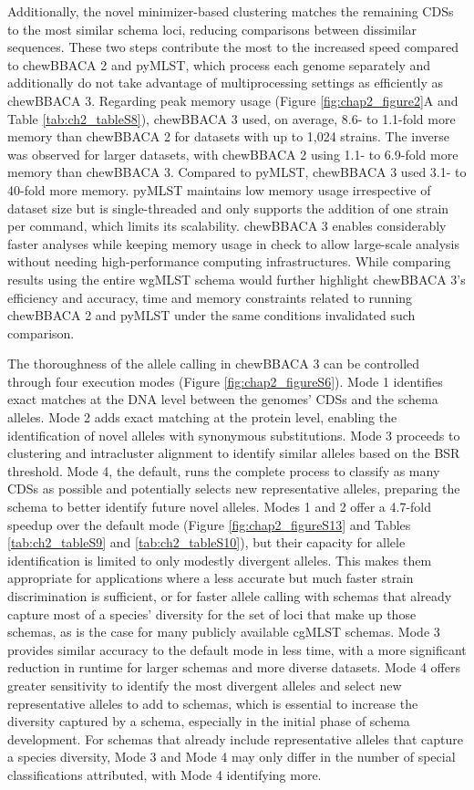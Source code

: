 Additionally, the novel minimizer-based clustering matches the remaining \acp{CDS} to the most similar schema loci, reducing comparisons between dissimilar sequences. These two steps contribute the most to the increased speed compared to chewBBACA 2 and pyMLST, which process each genome separately and additionally do not take advantage of multiprocessing settings as efficiently as chewBBACA 3. Regarding peak memory usage (Figure \ref{fig:chap2_figure2}A and Table \ref{tab:ch2_tableS8}), chewBBACA 3 used, on average, 8.6- to 1.1-fold more memory than chewBBACA 2 for datasets with up to 1,024 strains. The inverse was observed for larger datasets, with chewBBACA 2 using 1.1- to 6.9-fold more memory than chewBBACA 3. Compared to pyMLST, chewBBACA 3 used 3.1- to 40-fold more memory. pyMLST maintains low memory usage irrespective of dataset size but is single-threaded and only supports the addition of one strain per command, which limits its scalability. chewBBACA 3 enables considerably faster analyses while keeping memory usage in check to allow large-scale analysis without needing high-performance computing infrastructures. While comparing results using the entire \ac{wgMLST} schema would further highlight chewBBACA 3’s efficiency and accuracy, time and memory constraints related to running chewBBACA 2 and pyMLST under the same conditions invalidated such comparison.

The thoroughness of the allele calling in chewBBACA 3 can be controlled through four execution modes (Figure \ref{fig:chap2_figureS6}). Mode 1 identifies exact matches at the \ac{DNA} level between the genomes’ \acp{CDS} and the schema alleles. Mode 2 adds exact matching at the protein level, enabling the identification of novel alleles with synonymous substitutions. Mode 3 proceeds to clustering and intracluster alignment to identify similar alleles based on the \ac{BSR} threshold. Mode 4, the default, runs the complete process to classify as many \acp{CDS} as possible and potentially selects new representative alleles, preparing the schema to better identify future novel alleles. Modes 1 and 2 offer a 4.7-fold speedup over the default mode (Figure \ref{fig:chap2_figureS13} and Tables \ref{tab:ch2_tableS9} and \ref{tab:ch2_tableS10}), but their capacity for allele identification is limited to only modestly divergent alleles. This makes them appropriate for applications where a less accurate but much faster strain discrimination is sufficient, or for faster allele calling with schemas that already capture most of a species’ diversity for the set of loci that make up those schemas, as is the case for many publicly available \ac{cgMLST} schemas. Mode 3 provides similar accuracy to the default mode in less time, with a more significant reduction in runtime for larger schemas and more diverse datasets. Mode 4 offers greater sensitivity to identify the most divergent alleles and select new representative alleles to add to schemas, which is essential to increase the diversity captured by a schema, especially in the initial phase of schema development. For schemas that already include representative alleles that capture a species diversity, Mode 3 and Mode 4 may only differ in the number of special classifications attributed, with Mode 4 identifying more.

